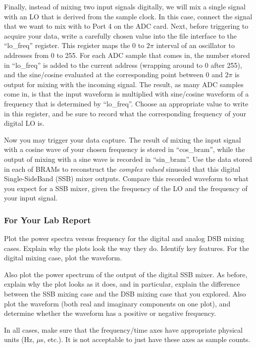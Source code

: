 \documentclass[11pt]{article}
\begin{document}
Finally, instead of mixing two input signals digitally, we will mix a single signal with an LO that is
derived from the sample clock.  In this case, connect the signal that we want to mix with to Port 4
on the ADC card.  Next, before triggering to acquire your data, write a carefully chosen value
into the file interface to the ``lo\_freq'' register.  This register maps the 0 to $2\pi$ interval
of an oscillator to addresses from 0 to 255.  For each ADC sample that comes in, the number stored
in ``lo\_freq'' is added to the current address (wrapping around to 0 after 255), and the sine/cosine
evaluated at the corresponding point between 0 and $2\pi$ is output for mixing with the incoming signal.
The result, as many ADC samples come in, is that the input waveform is multiplied with sine/cosine waveform
of a frequency that is determined by ``lo\_freq''.  Choose an appropriate value to write in this register,
and be sure to record what the corresponding frequency of your digital LO is.

Now you may trigger your data capture.  The result of mixing the input signal with a cosine wave of your
chosen frequency is stored in ``cos\_bram'', while the output of mixing with a sine wave is recorded
in ``sin\_bram''.  Use the data stored in each of BRAMs to reconstruct the {\it complex valued} sinusoid
that this digital Single-SideBand (SSB) mixer outputs.  Compare this recorded waveform to what you
expect for a SSB mixer, given the frequency of the LO and the frequency of your input signal.

\subsubsection{For Your Lab Report}

        Plot the power spectra versus
frequency for the digital and analog DSB mixing cases. Explain why the plots look the way they do.  Identify
key features.  For the digital mixing case, plot the waveform.

Also plot the power spectrum of the output of the digital SSB mixer.  As before, explain why the plot
looks as it does, and in particular, explain the difference between the SSB mixing case and the DSB mixing
case that you explored.  Also plot the waveform (both real and imaginary components on one plot), and determine
whether the waveform has a positive or negative frequency.

In all cases, make sure that the frequency/time axes have appropriate physical units (Hz, $\mu$s, etc.).
It is not acceptable to just have these axes as sample counts.
\end{document}
